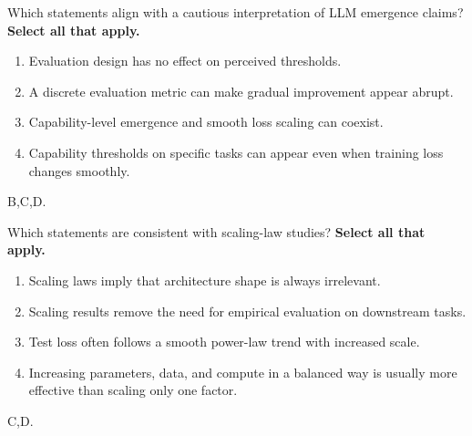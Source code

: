 \question[4]
Which statements align with a cautious interpretation of LLM emergence claims? \textbf{Select all that apply.}
\begin{enumerate}
\item Evaluation design has no effect on perceived thresholds. 
\item A discrete evaluation metric can make gradual improvement appear abrupt.
\item Capability-level emergence and smooth loss scaling can coexist.
\item Capability thresholds on specific tasks can appear even when training loss changes smoothly.
\end{enumerate}
\begin{soln}
B,C,D.
\end{soln}


\question[4]
Which statements are consistent with scaling-law studies? \textbf{Select all that apply.}
\begin{enumerate}
\item Scaling laws imply that architecture shape is always irrelevant.
\item Scaling results remove the need for empirical evaluation on downstream tasks.
\item Test loss often follows a smooth power-law trend with increased scale.
\item Increasing parameters, data, and compute in a balanced way is usually more effective than scaling only one factor.
\end{enumerate}
\begin{soln}
C,D.
\end{soln}




